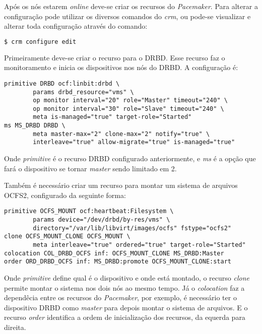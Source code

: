 Após os nós estarem \textit{online} deve-se criar os recursos do \textit{Pacemaker}. Para alterar a configuração pode utilizar os diversos
comandos do \textit{crm}, ou pode-se visualizar e alterar toda configuração através do comando:
\begin{lstlisting}[language=bash]
 $ crm configure edit
\end{lstlisting}

Primeiramente deve-se criar o recurso para o \ac{DRBD}. Esse recurso faz o monitoramento e inicia os dispositivos nos nós do \ac{DRBD}.
A configuração é:
\begin{lstlisting}
primitive DRBD ocf:linbit:drbd \
        params drbd_resource="vms" \
        op monitor interval="20" role="Master" timeout="240" \
        op monitor interval="30" role="Slave" timeout="240" \
        meta is-managed="true" target-role="Started"
ms MS_DRBD DRBD \
        meta master-max="2" clone-max="2" notify="true" \ 
        interleave="true" allow-migrate="true" is-managed="true" 
\end{lstlisting}
Onde \textit{primitive} é o recurso \ac{DRBD} configurado anteriormente, e \textit{ms} é a opção que fará o dispositivo se tornar \textit{master}
sendo limitado em 2.

Também é necessário criar um recurso para montar um sistema de arquivos \ac{OCFS2}, configurado da seguinte forma:
\begin{lstlisting}
primitive OCFS_MOUNT ocf:heartbeat:Filesystem \
        params device="/dev/drbd/by-res/vms" \ 
        directory="/var/lib/libvirt/images/ocfs" fstype="ocfs2"
clone OCFS_MOUNT_CLONE OCFS_MOUNT \
        meta interleave="true" ordered="true" target-role="Started"
colocation COL_DRBD_OCFS inf: OCFS_MOUNT_CLONE MS_DRBD:Master
order ORD_DRBD_OCFS inf: MS_DRBD:promote OCFS_MOUNT_CLONE:start
\end{lstlisting}
Onde \textit{primitive} define qual é o dispositivo e onde está montado, o recurso \textit{clone} permite montar o sistema nos dois nós
ao mesmo tempo. Já o \textit{colocation} faz a dependêcia entre os recursos do \textit{Pacemaker}, por exemplo, é necessário ter o dispositivo 
\ac{DRBD} como \textit{master} para depois montar o sistema de arquivos. E o recurso \textit{order} identifica a ordem de inicialização dos 
recursos, da equerda para direita.

